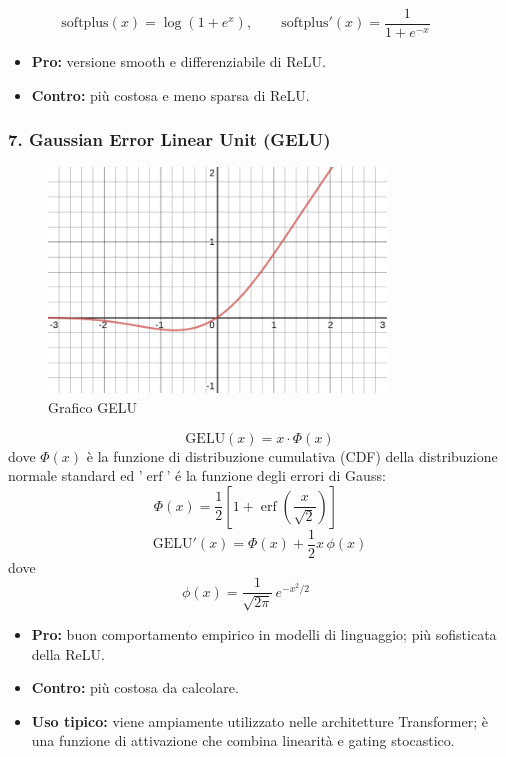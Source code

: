 \documentclass[a4paper,12pt]{report}
\begin{document}
	\[
	\mathrm{softplus}(x)=\log(1+e^x),\qquad
	\mathrm{softplus}'(x)=\frac{1}{1+e^{-x}}\qquad
	\]
	\begin{itemize}
		\item \textbf{Pro:} versione smooth e differenziabile di ReLU.
		\item \textbf{Contro:} più costosa e meno sparsa di ReLU.
	\end{itemize}
	
	\subsubsection{7. Gaussian Error Linear Unit (GELU)}
	
	\begin{figure}[H]
		\centering
		\includegraphics[width=0.8\textwidth]{img/gelu.png}
		\caption{Grafico GELU}
	\end{figure}
	
	\[
	\mathrm{GELU}(x) = x \cdot \Phi(x)
	\]
	dove \(\Phi(x)\) è la funzione di distribuzione cumulativa (CDF) della distribuzione normale standard ed '$\operatorname{erf}$' é la funzione degli errori di Gauss:
	\[
	\Phi(x) = \frac{1}{2} \left[ 1 + \operatorname{erf} \left( \frac{x}{\sqrt{2}} \right) \right] \qquad
	\]
	\[
	\mathrm{GELU}'(x) = \Phi(x) + \frac{1}{2}x\,\phi(x)
	\]
	dove
	\[
	\phi(x) = \frac{1}{\sqrt{2\pi}}\,e^{-x^{2}/2} \qquad
	\]
	\begin{itemize}
		\item \textbf{Pro:} buon comportamento empirico in modelli di linguaggio; più sofisticata della ReLU.
		\item \textbf{Contro:} più costosa da calcolare.
		\item \textbf{Uso tipico:} viene ampiamente utilizzato nelle architetture Transformer; è una funzione di attivazione  che combina linearità e gating stocastico.
	\end{itemize}
	
\end{document}
